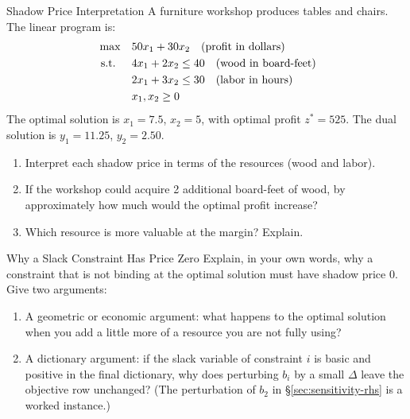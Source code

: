 
\begin{ex}{Shadow Price Interpretation}{}
\label{ex:shadow-price-workshop}
 A furniture workshop produces tables and chairs. The linear program is:
\[
\begin{aligned}
\max \quad & 50x_1 + 30x_2 \quad \mbox{(profit in dollars)}\\
\mbox{ s.t. } \quad
& 4x_1 + 2x_2 \leq 40 \quad \mbox{(wood in board-feet)} \\
& 2x_1 + 3x_2 \leq 30 \quad \mbox{(labor in hours)} \\
& x_1, x_2 \geq 0
\end{aligned}
\]
The optimal solution is $x_1 = 7.5$, $x_2 = 5$, with optimal profit $z^* = 525$.  The dual solution is $y_1 = 11.25$, $y_2 = 2.50$.

\begin{enumerate}
\item Interpret each shadow price in terms of the resources (wood and labor).
\item If the workshop could acquire 2 additional board-feet of wood, by approximately how much would the optimal profit increase?
\item Which resource is more valuable at the margin? Explain.
\end{enumerate}
\exrefs{\S\ref{sec:sensitivity-rhs}}
\end{ex}

\begin{ex}{Why a Slack Constraint Has Price Zero}{}
 Explain, in your own words, why a constraint that is not binding at the optimal solution must have shadow price $0$. Give two arguments:
\begin{enumerate}
\item A geometric or economic argument: what happens to the optimal solution when you add a little more of a resource you are not fully using?
\item A dictionary argument: if the slack variable of constraint $i$ is basic and positive in the final dictionary, why does perturbing $b_i$ by a small $\Delta$ leave the objective row unchanged? (The perturbation of $b_2$ in \S\ref{sec:sensitivity-rhs} is a worked instance.)
\end{enumerate}
\exrefs{\S\ref{sec:sensitivity-rhs}, \S\ref{sec:sensitivity-overview}}
\end{ex}

